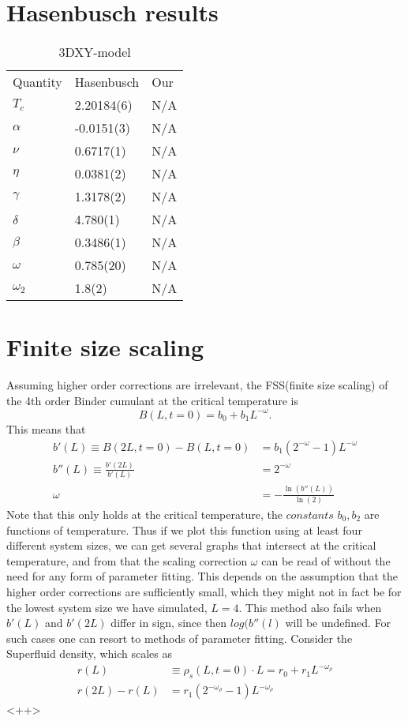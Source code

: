 \documentclass[a4paper]{article}
\begin{document}
\section{Hasenbusch results}
\begin{table}[htpb]
\begin{center}
\begin{tabular}{l l l}
  Quantity & Hasenbusch & Our\\
  $T_c$	& 2.20184(6) & N/A\\
  $\alpha $	& -0.0151(3) & N/A\\
  $\nu	  $      & 0.6717(1) & N/A\\
  $\eta   $      & 0.0381(2) & N/A\\
  $\gamma $	& 1.3178(2) & N/A\\
  $\delta $	& 4.780(1) & N/A\\
  $\beta  $      & 0.3486(1) & N/A\\
  $\omega $      & 0.785(20) & N/A\\
  $\omega_2$ 	& 1.8(2) & N/A\\
\end{tabular}
\end{center}
\caption{3DXY-model }
\end{table}

\section{Finite size scaling}

Assuming higher order corrections are irrelevant, the FSS(finite size scaling) of the  4th order Binder cumulant at the critical temperature is
\begin{equation}
  B(L,t=0) = b_0 + b_1L^{-\omega}.
\end{equation}
This means that
\begin{align}
  b'(L) \equiv B(2L,t=0) - B(L,t=0) &= b_1(2^{-\omega} -1)L^{-\omega}\\
  b''(L)\equiv \frac{b'(2L)}{b'(L)} &= 2^{-\omega}\\
  \omega &= -\frac{\ln(b''(L))}{\ln(2)}
\end{align}
Note that this only holds at the critical temperature, the $\textit{constants}$ $b_0, b_2$ are functions of temperature. Thus if we plot this function using at least four different system sizes, we can get several graphs that intersect at the critical temperature, and from that the scaling correction $\omega$ can be read of without the need for any form of parameter fitting. This depends on the assumption that the higher order corrections are sufficiently small, which they might not in fact be for the lowest system size we have simulated, $L=4$. This method also fails when $b'(L)$ and $b'(2L)$ differ in sign, since then $log(b''(l)$ will be undefined.
For such cases one can resort to methods of parameter fitting.
Consider the Superfluid density, which scales as 
\begin{align}
  r(L)&\equiv \rho_s(L,t=0) \cdot L = r_0 + r_1L^{-\omega_\rho}\\
  r(2L) - r(L) &= r_1(2^{-\omega_\rho} -1)L^{-\omega_\rho}
  \label{<++>}
\end{align}<++>
\end{document}
